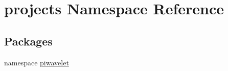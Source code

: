 \hypertarget{namespaceprojects}{\section{projects Namespace Reference}
\label{namespaceprojects}
}
\subsection*{Packages}
\begin{DoxyCompactItemize}
\item 
namespace \hyperlink{namespaceprojects_1_1piwavelet}{piwavelet}
\end{DoxyCompactItemize}
